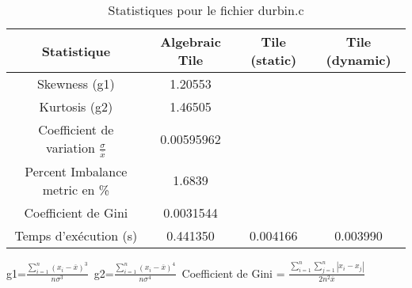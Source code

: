 \documentclass{article}
\begin{document}
\begin{table}[htbp]
  \centering
  \caption{Statistiques pour le fichier durbin.c}
  \begin{tabular}{|c|c|c|c|}
    \hline
    Statistique & Algebraic Tile & Tile (static) & Tile (dynamic) \\ 
    \hline
    Skewness (g1)  & 1.20553 &  &  \\ 
    Kurtosis (g2)  & 1.46505 &  &  \\ 
    Coefficient de variation $ \frac{\sigma}{\overline{x}} $ & 0.00595962 &  & \\ 
    Percent Imbalance metric en \% & 1.6839 &  & \\ 
    Coefficient de Gini  & 0.0031544 &  & \\ 
    Temps d'exécution (s) &  0.441350    &  0.004166   &  0.003990   \\ 

    \hline
  \end{tabular}
\end{table}\newline
g1=$ \frac{\sum_{i=1}^{n} (x_i - \overline{x})^3}{n\sigma^3} $\
g2=$ \frac{\sum_{i=1}^{n} (x_i - \overline{x})^4}{n\sigma^4} $\
Coefficient de Gini = $ \frac{\sum_{i=1}^{n}\sum_{j=1}^{n} |x_i - x_j|}{2n^2\overline{x}} $\
\newpage
\end{document}
